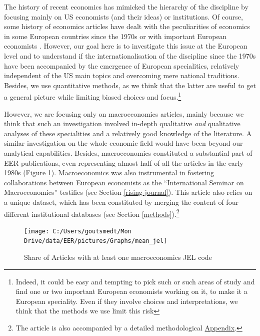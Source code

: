 \documentclass[]{elsarticle} %
\begin{document}
The history of recent economics has mimicked the hierarchy of the
discipline by focusing mainly on US economists (and their ideas) or
institutions. Of course, some history of economics articles have dealt
with the peculiarities of economics in some European countries since the
1970s or with important European economists
\citep{maes2005, benest2019}. However, our goal here is to investigate
this issue at the European level and to understand if the
internationalisation of the discipline since the 1970s have been
accompanied by the emergence of European specialities, relatively
independent of the US main topics and overcoming mere national
traditions. Besides, we use quantitative methods, as we think that the
latter are useful to get a general picture while limiting biased choices
and focus.\footnote{Indeed, it could be easy and tempting to pick such
  or such areas of study and find one or two important European
  economists working on it, to make it a European speciality. Even if
  they involve choices and interpretations, we think that the methods we
  use limit this risk}

However, we are focusing only on macroeconomics articles, mainly because
we think that such an investigation involved in-depth qualitative
\emph{and} qualitative analyses of these specialities and a relatively
good knowledge of the literature. A similar investigation on the whole
economic field would have been beyond our analytical capabilities.
Besides, macroeconomics constituted a substantial part of EER
publications, even representing almost half of all the articles in the
early 1980s (Figure \ref{fig:plot-jel}). Macroeconomics was also
instrumental in fostering collaborations between European economists as
the ``International Seminar on Macroeconomics'' testifies (see Section
\ref{rising-journal}). This article also relies on a unique dataset,
which has been constituted by merging the content of four different
institutional databases (see Section \ref{methods}).\footnote{The
  article is also accompanied by a detailed methodological
  \protect\hyperlink{appendix}{Appendix}.}

\begin{figure}[h]

{\centering \texttt{[image: C:/Users/goutsmedt/Mon Drive/data/EER/pictures/Graphs/mean\_jel]} 

}

\caption{Share of Articles with at least one macroeconomics JEL code}\label{fig:plot-jel}
\end{figure}
\end{document}
